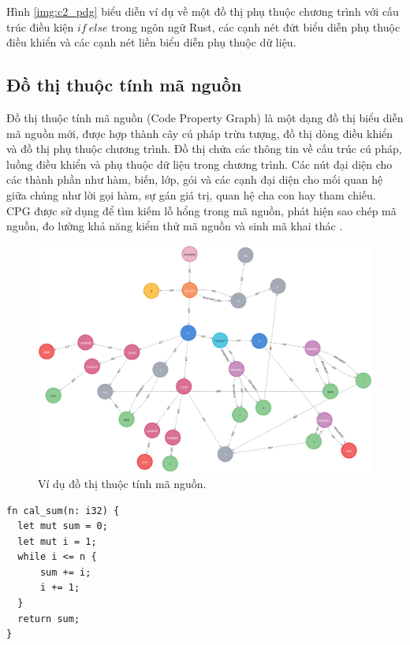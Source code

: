 Hình \ref{img:c2_pdg} biểu diễn ví dụ về một đồ thị phụ thuộc chương trình với cấu trúc điều kiện $if\ else$ trong ngôn ngữ Rust, các cạnh nét đứt biểu diễn phụ thuộc điều khiển và các cạnh nét liền biểu diễn phụ thuộc dữ liệu.

\subsection{Đồ thị thuộc tính mã nguồn}

Đồ thị thuộc tính mã nguồn (Code Property Graph) \cite{yamaguchi2014modeling} là một dạng đồ thị biểu diễn mã nguồn mới, được hợp thành cây cú pháp trừu tượng, đồ thị dòng điều khiển và đồ thị phụ thuộc chương trình.
Đồ thị chứa các thông tin về cấu trúc cú pháp, luồng điều khiển và phụ thuộc dữ liệu trong chương trình.
Các nút đại diện cho các thành phần như hàm, biến, lớp, gói và các cạnh đại diện cho mối quan hệ giữa chúng như lời gọi hàm, sự gán giá trị, quan hệ cha con hay tham chiếu.
CPG được sử dụng để tìm kiếm lỗ hổng trong mã nguồn, phát hiện sao chép mã nguồn, đo lường khả năng kiểm thử mã nguồn và sinh mã khai thác \cite{xiaomeng2018cpgva, han2023bjxnet, kuchler2022representing}.

\begin{figure}[H]
  \includegraphics[width=1\columnwidth]{figures/c2/c2_cpg.png}
  \centering
  \caption{Ví dụ đồ thị thuộc tính mã nguồn.}
  \label{img:c2_cpg}
\end{figure}

\begin{listing}[H]
\begin{verbatim}
fn cal_sum(n: i32) {
  let mut sum = 0;
  let mut i = 1;
  while i <= n {
      sum += i;
      i += 1;
  }
  return sum;
}
\end{verbatim}
\caption{Mã nguồn đầy đủ cho đồ thị thuộc tính mã nguồn hình \ref{img:c2_cpg}.}
\label{code:c2_cpg}
\end{listing}
